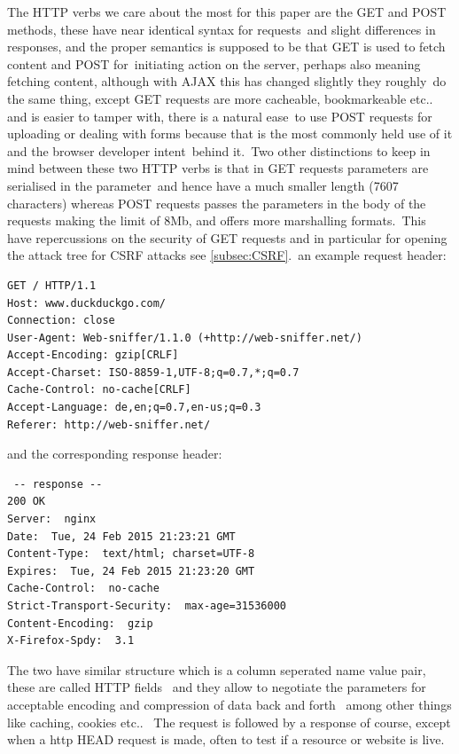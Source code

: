 The HTTP verbs we care about the most for this paper are the GET and POST methods, these have near identical syntax for requests\
and slight differences in responses, and the proper semantics is supposed to be that GET is used to fetch content and POST for\
initiating action on the server, perhaps also meaning fetching content, although with AJAX this has changed slightly they roughly\
do the same thing, except GET requests are more cacheable, bookmarkeable etc.. and is easier to tamper with, there is a natural ease\
to use POST requests for uploading or dealing with forms because that is the most commonly held use of it and the browser developer intent\
behind it.\ Two other distinctions to keep in mind between these two HTTP verbs is that in GET requests parameters are serialised in the parameter\
and hence have a much smaller length (7607 characters) whereas POST requests passes the parameters in the body of the requests making the limit of 8Mb, and offers more marshalling formats.\
This have repercussions on the security of GET requests and in particular for opening the attack tree for CSRF attacks see \ref{subsec:CSRF}.\
an example request header:\\

\begin{verbatim}
GET / HTTP/1.1
Host: www.duckduckgo.com/
Connection: close
User-Agent: Web-sniffer/1.1.0 (+http://web-sniffer.net/)
Accept-Encoding: gzip[CRLF]
Accept-Charset: ISO-8859-1,UTF-8;q=0.7,*;q=0.7
Cache-Control: no-cache[CRLF]
Accept-Language: de,en;q=0.7,en-us;q=0.3
Referer: http://web-sniffer.net/
\end{verbatim}

and the corresponding response header:

\begin{verbatim}
 -- response --
200 OK
Server:  nginx
Date:  Tue, 24 Feb 2015 21:23:21 GMT
Content-Type:  text/html; charset=UTF-8
Expires:  Tue, 24 Feb 2015 21:23:20 GMT
Cache-Control:  no-cache
Strict-Transport-Security:  max-age=31536000
Content-Encoding:  gzip
X-Firefox-Spdy:  3.1
\end{verbatim}

The two have similar structure which is a column seperated name value pair, these are called HTTP fields \
and they allow to negotiate the parameters for acceptable encoding and compression of data back and forth \
among other things like caching, cookies etc.. \
The request is followed by a response of course, except when a http HEAD request is made, often to test if a resource or website is live.\\

